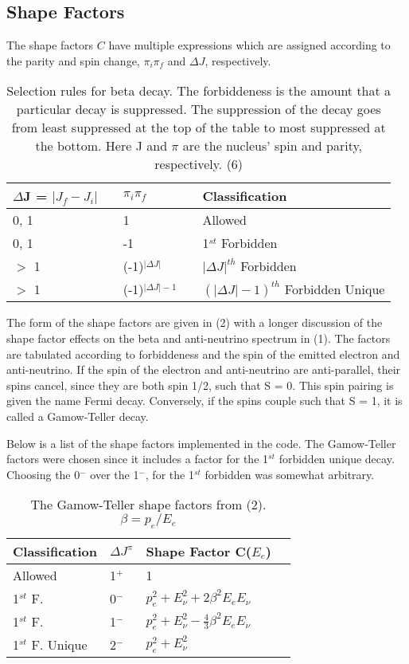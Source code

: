 \documentclass{report}
\begin{document}
\subsection{Shape Factors}
The shape factors $C$ have multiple expressions which are assigned according to the parity and spin change, 
$\pi_i\pi_f$ and $\Delta J$, respectively.
\begin{table}[H]
\centering
\caption{Selection rules for beta decay. The forbiddeness is the amount that a particular decay 
is suppressed. The suppression of the decay goes from least suppressed at the top of the table to
 most suppressed at the bottom. Here J and $\pi$ are the nucleus' spin and parity, respectively. (6)}
\renewcommand{\arraystretch}{1.75}
  \begin{tabular}{lllll}
    \toprule 
      $ \Delta $J  = $|J_f - J_i|$& & $\pi_i \pi_f$ &  & Classification  \\
       \midrule
  	0, 1 & &1 &  & Allowed  \\
   	 0, 1 & &-1 &  & 1$^{st}$ Forbidden \\
	  $>$ 1 & &(-1)$^{|\Delta J|}$ &  & $|\Delta J|^{th}$ Forbidden \\
	 $>$ 1 & &(-1)$^{|\Delta J| - 1}$ &  & $(|\Delta J| - 1 )^{th}$ Forbidden Unique  \\
    	   \bottomrule
  \end{tabular}
\end{table}
The form of the shape factors are given in (2) with a longer discussion of the shape factor effects on 
the beta and anti-neutrino spectrum in (1). The factors are tabulated according to forbiddeness  and the spin 
of the emitted electron and anti-neutrino. If the spin of the electron and anti-neutrino are anti-parallel, their spins
cancel, since they are both spin 1/2, such that S = 0. This spin pairing is given the name Fermi decay. Conversely, if the spins couple 
such that S = 1, it is called a Gamow-Teller decay. 

Below is a list of the shape factors implemented in the code. The Gamow-Teller factors were chosen 
since it includes a factor for the 1$^{st}$ forbidden unique decay. Choosing the 0$^-$ over the 
1$^-$, for the 1$^{st}$ forbidden was somewhat arbitrary. 
\begin{table}[H]
\centering
\caption{The Gamow-Teller shape factors from (2). $\beta = p_e/ E_e$}
\renewcommand{\arraystretch}{1.75}
  \begin{tabular}{llll}
    \toprule 
      Classification & $\Delta J^{\pi}$ & Shape Factor C($E_e$) &    \\
       \midrule
  	Allowed &1$^+$ & 1 &     \\
	1$^{st}$ F. &0$^-$ & $p_e^2 + E_{\nu}^2 + 2\beta^2E_eE_{\nu}$ &     \\
	1$^{st}$ F. &1$^-$ & $p_e^2 + E_{\nu}^2 - \frac{4}{3}\beta^2E_eE_{\nu}$ &     \\
	1$^{st}$ F. Unique &2$^-$ & $p_e^2 + E_{\nu}^2$ &     \\
    	   \bottomrule
  \end{tabular}
\end{table}
 
\end{document}

